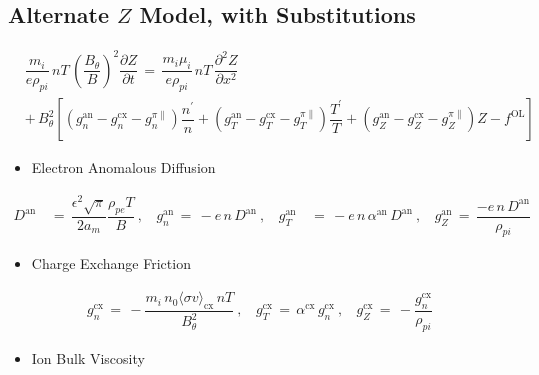 \documentclass[a4paper,8pt]{article}
\providecommand{\tightlist}{%
  \setlength{\itemsep}{0pt}\setlength{\parskip}{0pt}}
\begin{document}
\subsection{\texorpdfstring{Alternate \(Z\) Model, with
Substitutions}{Alternate Z Model, with Substitutions}}\label{alternate-z-model-with-substitutions}

\begin{align}
    &\dfrac{m_i}{e \rho_{pi}} \,n T\, \left(\dfrac{B_\theta}{B}\right)^2 \dfrac{\partial Z}{\partial t} \,=\, \dfrac{m_i \mu_i}{e \rho_{pi}} \,n T\, \dfrac{\partial^2 Z}{\partial x^2} \\
    &+\, B_\theta^2 \left[\left(g_n^\text{an} - g_n^\text{cx} - g_n^{\pi\parallel}\right) \dfrac{n^\prime}{n} + \left(g_T^\text{an} - g_T^\text{cx} - g_T^{\pi\parallel}\right) \dfrac{T^\prime}{T} + \left(g_Z^\text{an} - g_Z^\text{cx} - g_Z^{\pi\parallel}\right) Z - f^\text{OL}\right]
\end{align}

\begin{itemize}
\tightlist
\item
  Electron Anomalous Diffusion
\end{itemize}

\begin{align}
    D^\text{an} \,&=\, \dfrac{\epsilon^2 \sqrt{\pi}}{2 a_m} \dfrac{\rho_{pe} T}{B}~,~~~~ g_n^\text{an} \,=\, -e \,n\, D^\text{an}~,~~~~ g_T^\text{an} \,&=\, -e \,n\, \alpha^\text{an}\, D^\text{an}~,~~~~ g_Z^\text{an} \,=\, \dfrac{-e \,n\, D^\text{an}}{\rho_{pi}}
\end{align}

\begin{itemize}
\tightlist
\item
  Charge Exchange Friction
\end{itemize}

\begin{align}
    g_n^\text{cx} \,=\, -\dfrac{m_i \,n_0 \langle\sigma v\rangle_\text{cx} \,n T}{B_\theta^2}~,~~~~ g_T^\text{cx} \,=\, \alpha^\text{cx}\,g_n^\text{cx}~,~~~~ g_Z^\text{cx} \,=\, -\dfrac{g_n^\text{cx}}{\rho_{pi}}
\end{align}

\begin{itemize}
\tightlist
\item
  Ion Bulk Viscosity
\end{itemize}
\end{document}
